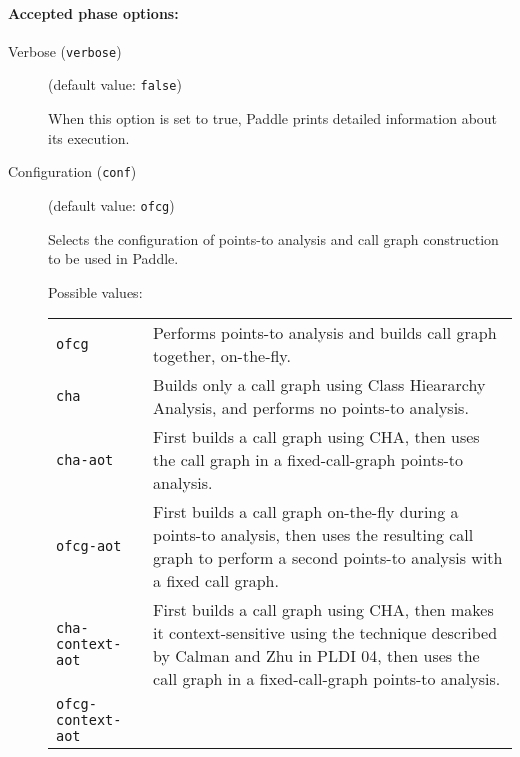 \documentclass{article}
\begin{document}
\paragraph{Accepted phase options:} 

\begin{description}

\item[Verbose ({\tt verbose})]
(default value: {\tt false})




When this option is set to true, Paddle prints detailed information about its execution.
        


\item[Configuration ({\tt conf})]
(default value: {\tt ofcg})




Selects the configuration of points-to analysis and call graph construction
to be used in Paddle.
        



Possible values:\\
\begin{longtable}{p{1in}p{4in}}

{\tt ofcg }
&

Performs points-to analysis and builds call graph together, on-the-fly.
\\

{\tt cha }
&

Builds only a call graph using Class Hieararchy Analysis, and performs no
points-to analysis.
\\

{\tt cha-aot }
&

First builds a call graph using CHA, then uses the call graph in a fixed-call-graph points-to analysis.
\\

{\tt ofcg-aot }
&

First builds a call graph on-the-fly during a points-to analysis, then
uses the resulting call graph to perform a second points-to analysis
with a fixed call graph.
\\

{\tt cha-context-aot }
&

First builds a call graph using CHA, then makes it context-sensitive using
the technique described by Calman and Zhu in PLDI 04,
then uses the call graph in a fixed-call-graph points-to analysis.
\\

{\tt ofcg-context-aot }
&


\end{longtable}
\end{description}
\end{document}
